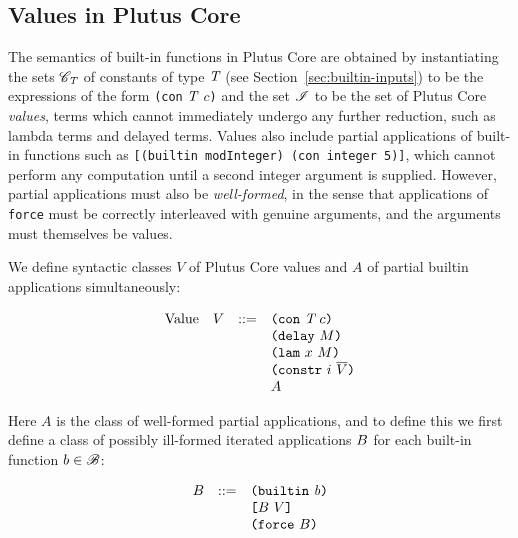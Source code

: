 \subsection{Values in Plutus Core}
\label{sec:uplc-values}
The semantics of built-in functions in Plutus Core are obtained by instantiating
the sets $\mathscr{C}_{\textit{T}}$ of constants of type $\textit{T}$ (see
Section~\ref{sec:builtin-inputs}) to be the expressions of the form
\texttt{(con} $\textit{T}$ $c$\texttt{)} and the set $\mathscr{I}$ to be the set of Plutus
Core \textit{values}, terms which cannot immediately undergo any further
reduction, such as lambda terms and delayed terms.  Values also include partial
applications of built-in functions such as \texttt{[(builtin modInteger) (con
    integer 5)]}, which cannot perform any computation until a second integer
argument is supplied.  However, partial applications must also be
\textit{well-formed}, in the sense that applications of \texttt{force} must be
correctly interleaved with genuine arguments, and the arguments must themselves
be values.

We define syntactic classes $V$ of Plutus Core values and $A$ of partial builtin
applications simultaneously:

\begin{minipage}{\linewidth}
    \centering
    \[\begin{array}{lrcl}
        \textrm{Value}  & V   & ::= & \texttt{(} \texttt{con} ~ \textit{T} ~ c \texttt{)} \\
                        &     &     & \texttt{(} \texttt{delay} ~ M \texttt{)} \\
                        &     &     & \texttt{(} \texttt{lam} ~ x ~ M  \texttt{)} \\
                        &     &     & \texttt{(} \texttt{constr} ~ i ~ \overline{V} \texttt{)} \\
                        &     &     & A
    \end{array}\]
    \label{fig:untyped-cek-values}
\end{minipage}%
%

\medskip
\noindent Here $A$ is the class of well-formed partial applications, and to define
this we first define a class of possibly ill-formed iterated applications $B$ for
each built-in function $b \in \mathscr{B}$:

\begin{minipage}{\linewidth}
    \centering
  \[\begin{array}{lrl}
  B & ::= & \texttt{(} \texttt{builtin} ~ \mathit{b} \texttt{)}\\
       &     & \texttt{[} B ~ V \texttt{]}\\
       &    & \texttt{(} \texttt{force} ~ B \texttt{)}\\
    \end{array}\]
    \label{fig:partial-applications}
\end{minipage}%
%

